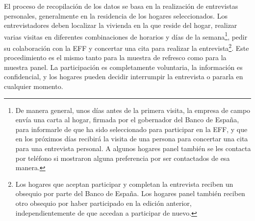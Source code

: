 El proceso de recopilación de los datos se basa en la realización de entrevistas personales, generalmente en la residencia de los hogares seleccionados. Los entrevistadores deben localizar la vivienda en la que reside del hogar, realizar varias visitas en diferentes combinaciones de horarios y días de la semana\footnote{De manera general, unos días antes de la primera visita, la empresa de campo envía una carta al hogar, firmada por el gobernador del Banco de España, para informarle de que ha sido seleccionado para participar en la EFF, y que en los próximos días recibirá la visita de una persona para concertar una cita para una entrevista personal. A algunos hogares panel también se les contacta por teléfono si mostraron alguna preferencia por ser contactados de esa manera.}, pedir su colaboración con la EFF y concertar una cita para realizar la entrevista\footnote{Los hogares que aceptan participar y completan la entrevista reciben un obsequio por parte del Banco de España. Los hogares panel también reciben otro obsequio por haber participado en la edición anterior, independientemente de que accedan a participar de nuevo.}. Este procedimiento es el mismo tanto para la muestra de refresco como para la muestra panel. La participación es completamente voluntaria, la información es confidencial, y los hogares pueden decidir interrumpir la entrevista o pararla en cualquier momento.

